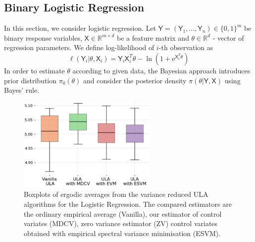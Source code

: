 \documentclass[bj]{imsart}
\def\rset{\mathbb{R}}
\def\rme{\mathrm{e}}
\def\rset{\mathbb{R}}
\begin{document}
\subsection{Binary Logistic Regression}
In this section, we consider  logistic regression. Let $\mathsf{Y} = \left(\mathsf{Y}_1,\ldots,\mathsf{Y}_n\right) \in \{0,1\}^m$ be binary response variables, $\mathsf{X} \in \rset^{m \times d}$ be a feature matrix and $\theta \in \rset^d$ - vector of regression parameters. We define log-likelihood of $i$-th observation as
\[
\ell(\mathsf{Y}_i | \theta, \mathsf{X}_i) = \mathsf{Y}_i \mathsf{X}_i^T\theta - \ln{(1 + \rme^{\mathsf{X}_i^T\theta})}
\]
In order to estimate $\theta$ according to given data, the Bayesian approach introduces prior distribution $\pi_0(\theta)$ and consider the posterior density $\pi(\theta| \mathsf{Y}, \mathsf{X})$ using Bayes' rule.

\begin{figure}[h]
\begin{center}
\includegraphics[width=0.6\textwidth]{../pictures/logreg_1st_order.png}
\caption{Boxplots of ergodic averages  from the variance reduced ULA algorithms for the Logistic Regression. The compared estimators are the ordinary empirical average (Vanilla), our estimator of control variates (MDCV), zero variance estimator (ZV) control variates obtained with empirical spectral variance minimisation (ESVM).
 \label{fig:2}}
\end{center}
\end{figure}
\end{document}
